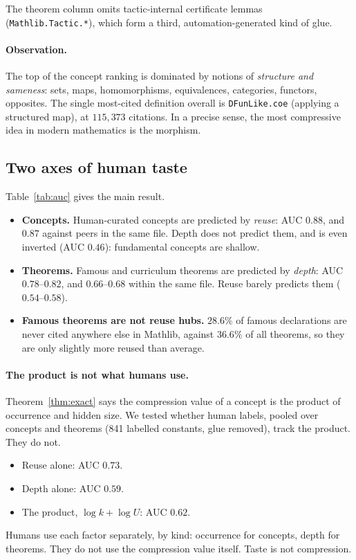 \documentclass[11pt]{article}
\theoremstyle{remark}
\newcommand{\lean}[1]{\texttt{#1}}
\begin{document}
\noindent The theorem column omits tactic-internal certificate lemmas
(\lean{Mathlib.Tactic.*}), which form a third, automation-generated kind of glue.

\paragraph{Observation.} The top of the concept ranking is dominated by notions of
\emph{structure and sameness}: sets, maps, homomorphisms, equivalences, categories,
functors, opposites. The single most-cited definition overall is \lean{DFunLike.coe}
(applying a structured map), at $115{,}373$ citations. In a precise sense, the most
compressive idea in modern mathematics is the morphism.

\subsection{Two axes of human taste}

Table~\ref{tab:auc} gives the main result.
\begin{itemize}
\item \textbf{Concepts.} Human-curated concepts are predicted by \emph{reuse}: AUC $0.88$,
  and $0.87$ against peers in the same file. Depth does not predict them, and is even
  inverted (AUC $0.46$): fundamental concepts are shallow.
\item \textbf{Theorems.} Famous and curriculum theorems are predicted by \emph{depth}:
  AUC $0.78$--$0.82$, and $0.66$--$0.68$ within the same file. Reuse barely predicts them
  ($0.54$--$0.58$).
\item \textbf{Famous theorems are not reuse hubs.} $28.6\%$ of famous declarations are never
  cited anywhere else in Mathlib, against $36.6\%$ of all theorems, so they are only
  slightly more reused than average.
\end{itemize}

\paragraph{The product is not what humans use.} Theorem~\ref{thm:exact} says the
compression value of a concept is the product of occurrence and hidden size. We tested
whether human labels, pooled over concepts and theorems (841 labelled constants, glue
removed), track the product. They do not.
\begin{itemize}
\item Reuse alone: AUC $0.73$.
\item Depth alone: AUC $0.59$.
\item The product, $\log k+\log U$: AUC $0.62$.
\end{itemize}
Humans use each factor separately, by kind: occurrence for concepts, depth for theorems.
They do not use the compression value itself. Taste is not compression.
\end{document}
